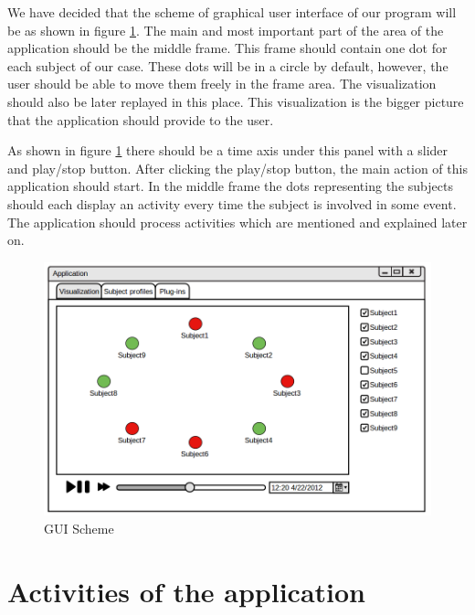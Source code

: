 We have decided that the scheme of graphical user interface of our program will be as shown in figure \ref{predstava}. The main and most important part of the area of the application should be the middle frame. This frame should contain one dot for each subject of our case. These dots will be in a circle by default, however, the user should be able to move them freely in the frame area. The visualization should also be later replayed in this place. This visualization is the bigger picture that the application should provide to the user. 

As shown in figure \ref{predstava} there should be a time axis under this panel with a slider and play/stop button. After clicking the play/stop button, the main action of this application should start. In the middle frame the dots representing the subjects should each display an activity every time the subject is involved in some event. The application should process activities which are mentioned and explained later on.


\begin{figure}[h]
	\begin{center} 
	\includegraphics[width=1.0\textwidth]{./img/GUI/visualization.png}
	\end{center}
	\caption{GUI Scheme}\label{predstava}
\end{figure}

\section {Activities of the application} %

